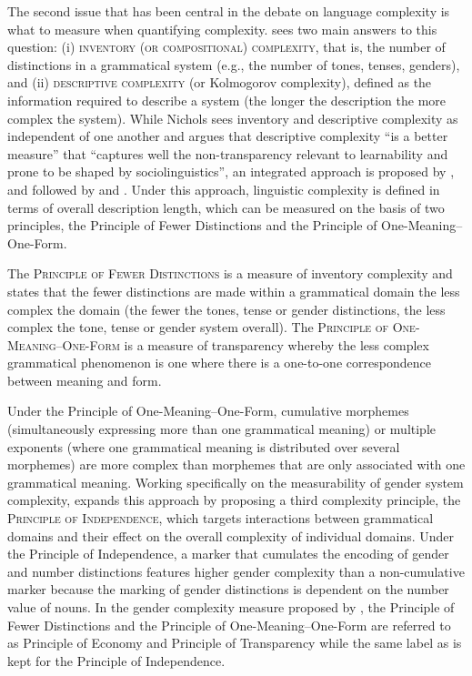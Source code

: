 \documentclass[output=collectionpaper]{langsci/langscibook}
\begin{document}
The second issue that has been central in the debate on language complexity is what to measure when quantifying complexity.  sees two main answers to this question: (i) \textsc{inventory (or compositional) complexity}, that is, the number of distinctions in a grammatical system (e.g., the number of tones, tenses, genders), and (ii) \textsc{descriptive complexity} (or Kolmogorov complexity), defined as the information required to describe a system (the longer the description the more complex the system). While Nichols sees inventory and descriptive complexity as independent of one another and argues that descriptive complexity ``is a better measure'' that ``captures well the non-transparency relevant to learnability and prone to be shaped by sociolinguistics'', an integrated approach is proposed by \citet{Miestamo2008}, and followed by  and . Under this approach, linguistic complexity is defined in terms of overall description length, which can be measured on the basis of two principles, the Principle of Fewer Distinctions and the Principle of One-Meaning--One-Form.

The \textsc{Principle of Fewer Distinctions} is a measure of inventory complexity and states that the fewer distinctions are made within a grammatical domain the less complex the domain (the fewer the tones, tense or gender distinctions, the less complex the tone, tense or gender system overall). The \textsc{Principle of One-Meaning--One-Form} is a measure of transparency whereby the less complex grammatical phenomenon is one where there is a one-to-one correspondence between meaning and form.

Under the Principle of One-Meaning--One-Form, cumulative morphemes (simultaneously expressing more than one grammatical meaning) or multiple exponents (where one grammatical meaning is distributed over several morphemes) are more complex than morphemes that are only associated with one grammatical meaning. Working specifically on the measurability of gender system complexity, \citet{DiGarbo2014,DiGarbo2016} expands this approach by proposing a third complexity principle, the \textsc{Principle of Independence}, which targets interactions between grammatical domains and their effect on the overall complexity of individual domains. Under the Principle of Independence, a marker that cumulates the encoding of gender and number distinctions features higher gender complexity than a non-cumulative marker because the marking of gender distinctions is dependent on the number value of nouns. In the gender complexity measure proposed by , the Principle of Fewer Distinctions and the Principle of One-Meaning--One-Form are referred to as Principle of Economy and Principle of Transparency while the same label as \citet{DiGarbo2014,DiGarbo2016} is kept for the Principle of Independence.
\end{document}
